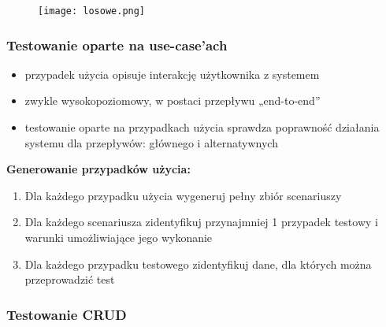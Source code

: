 \documentclass[../main.tex]{subfiles}
\begin{document}
    \begin{figure}[H]
        \texttt{[image: losowe.png]}
    \end{figure}

    \subsubsection{Testowanie oparte na use-case'ach}
    \begin{itemize}
        \item przypadek użycia opisuje interakcję użytkownika z systemem
        \item zwykle wysokopoziomowy, w postaci przepływu „end-to-end”
        \item testowanie oparte na przypadkach użycia sprawdza poprawność
        działania systemu dla przepływów: głównego i alternatywnych
    \end{itemize}

    \textbf{Generowanie przypadków użycia:}
    \begin{enumerate}
        \item Dla każdego przypadku użycia wygeneruj pełny zbiór scenariuszy
        \item Dla każdego scenariusza zidentyfikuj przynajmniej 1 przypadek testowy i warunki
        umożliwiające jego wykonanie
        \item Dla każdego przypadku testowego zidentyfikuj dane, dla których można przeprowadzić test
    \end{enumerate}


    \subsubsection{Testowanie CRUD}
\end{document}
